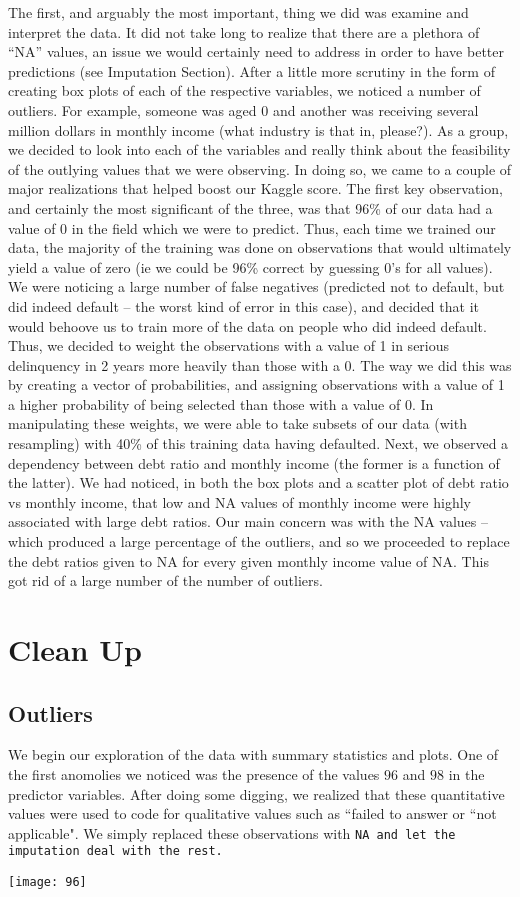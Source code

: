 \documentclass[11pt, oneside]{article}   	%
\begin{document}
The first, and arguably the most important, thing we did was examine and interpret the data. It did not take long to realize that there are a plethora of “NA” values, an issue we would certainly need to address in order to have better predictions (see Imputation Section). After a little more scrutiny in the form of creating box plots of each of the respective variables, we noticed a number of outliers. For example, someone was aged 0 and another was receiving several million dollars in monthly income (what industry is that in, please?). As a group, we decided to look into each of the variables and really think about the feasibility of the outlying values that we were observing. In doing so, we came to a couple of major realizations that helped boost our Kaggle score. 
The first key observation, and certainly the most significant of the three, was that 96\% of our data had a value of 0 in the field which we were to predict. Thus, each time we trained our data, the majority of the training was done on observations that would ultimately yield a value of zero (ie we could be 96\% correct by guessing 0’s for all values). We were noticing a large number of false negatives (predicted not to default, but did indeed default – the worst kind of error in this case), and decided that it would behoove us to train more of the data on people who did indeed default. Thus, we decided to weight the observations with a value of 1 in serious delinquency in 2 years more heavily than those with a 0. The way we did this was by creating a vector of probabilities, and assigning observations with a value of 1 a higher probability of being selected than those with a value of 0. In manipulating these weights, we were able to take subsets of our data (with resampling) with 40\% of this training data having defaulted. 
Next, we observed a dependency between debt ratio and monthly income (the former is a function of the latter). We had noticed, in both the box plots and a scatter plot of debt ratio vs monthly income, that low and NA values of monthly income were highly associated with large debt ratios. Our main concern was with the NA values – which produced a large percentage of the outliers, and so we proceeded to replace the debt ratios given to NA for every given monthly income value of NA. This got rid of a large number of the number of outliers.

\section{Clean Up}
	\subsection{Outliers}
	We begin our exploration of the data with summary statistics and plots. One of 
	the first anomolies we noticed was the presence of the values $96$ and $98$ 
	in the predictor variables. After doing some digging, we realized that 
	these quantitative values were used to code for qualitative values such as 
	``failed to answer or ``not applicable". We simply replaced these observations with
	\tt NA\rm~and let the imputation deal with the rest.
	\begin{center}
	\texttt{[image: 96]}
	\end{center}
\end{document}
